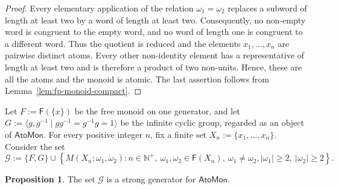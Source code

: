 \documentclass[a4paper,10pt,reqno]{amsart}
\theoremstyle{definition}
\newtheorem{proposition}[theorem]{Proposition}
\theoremstyle{remark}
\newcommand{\AtoMon}{\mathsf{AtoMon}}
\newcommand{\F}{\mathsf F}
\begin{document}
\begin{proof}
Every elementary application of the relation $\omega_1=\omega_2$ replaces a subword of length at least two by a word of length at least two.
Consequently, no non-empty word is congruent to the empty word, and no word of length one is congruent to a different word.  Thus the quotient is reduced and the elements $x_1,\ldots,x_n$ are
pairwise distinct atoms.  Every other non-identity element has a
representative of length at least two and is therefore a product of two non-units.  Hence, these are all the atoms and the monoid is atomic. The last assertion follows from Lemma~\ref{lem:fp-monoid-compact}.
\end{proof}



Let $F:=\F(\{x\})$ be the free monoid on one generator, and let
$G:=\langle g,g^{-1}\mid gg^{-1}=g^{-1}g=1\rangle$ be the infinite
cyclic group, regarded as an object of $\AtoMon$. For every positive integer $n$, fix a finite set $X_n:=\{x_1,\dots, x_n\}$. Consider the set
\begin{equation}\label{eq:G}
\mathcal G:=\{F,G\}\cup
\left\{
  M(X_n;\omega_1,\omega_2) :    n \in \mathbb N^+,\ \omega_1,\omega_2\in\F(X_n),\ \omega_1\neq\omega_2,
    |\omega_1|\geq 2,\ |\omega_2|\geq 2
\right\}.
\end{equation}



\begin{proposition}\label{prop:strong-generators}
The set $\mathcal G$ is a strong generator for $\AtoMon$.
\end{proposition}
\end{document}

